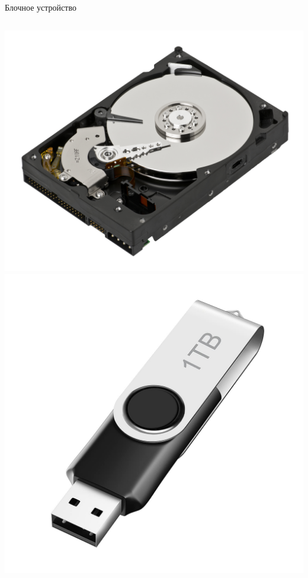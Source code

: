 \documentclass[aspectratio=169]{beamer}
\begin{document}
\begin{frame}{Блочное устройство}
\begin{columns}
    \begin{column}{.25\textwidth}
            \begin{center}
            \includegraphics[scale=0.07]{fig/6.hdd.jpg}
            \includegraphics[scale=0.06]{fig/7.flash.jpg}
            \end{center}
            
    \end{column}
\end{columns}
    
    
\end{frame}
\end{document}
